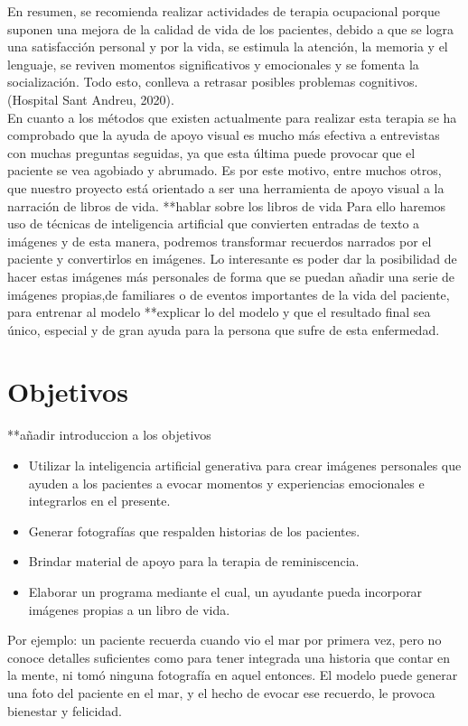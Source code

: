 En resumen, se recomienda realizar actividades de terapia ocupacional porque suponen una mejora de la calidad de vida de los pacientes, debido a que se logra una satisfacción personal y por la vida, se estimula la atención, la memoria y el lenguaje, se reviven momentos significativos y emocionales y se fomenta la socialización. Todo esto, conlleva a retrasar posibles problemas cognitivos. (Hospital Sant Andreu, 2020).\\

En cuanto a los métodos que existen actualmente para realizar esta terapia se ha comprobado que la ayuda de apoyo visual es mucho más efectiva a entrevistas con muchas preguntas seguidas, ya que esta última puede provocar que el paciente se vea agobiado y abrumado. Es por este motivo, entre muchos otros, que nuestro proyecto está orientado a ser una herramienta de apoyo visual a la narración de libros de vida. 
**hablar sobre los libros de vida
Para ello haremos uso de técnicas de inteligencia artificial que convierten entradas de texto a imágenes y de esta manera, podremos transformar recuerdos narrados por el paciente y convertirlos en imágenes. Lo interesante es poder dar la posibilidad de hacer estas imágenes más personales de forma que se puedan añadir una serie de imágenes propias,de familiares o de eventos importantes de la vida del paciente, para entrenar al modelo
**explicar lo del modelo
 y que el resultado final sea único, especial y de gran ayuda para la persona que sufre de esta enfermedad. 


\section{Objetivos}

**añadir introduccion a los objetivos
\begin{itemize}
	\item Utilizar la inteligencia artificial generativa para crear imágenes personales que ayuden a los pacientes a evocar momentos y experiencias emocionales e integrarlos en el presente.
	\item Generar fotografías que respalden historias de los pacientes.
	\item Brindar material de apoyo para la terapia de reminiscencia.
	\item Elaborar un programa mediante el cual, un ayudante pueda incorporar imágenes propias a un libro de vida. 
\end{itemize} 

Por ejemplo: un paciente recuerda cuando vio el mar por primera vez, pero no conoce detalles suficientes como para tener integrada una historia que contar en la mente, ni tomó ninguna fotografía en aquel entonces. El modelo puede generar una foto del paciente en el mar, y el hecho de evocar ese recuerdo, le provoca bienestar y felicidad.

